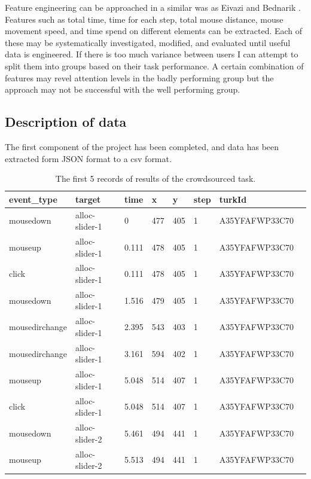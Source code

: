 \documentclass{article}
\begin{document}

Feature engineering can be approached in a similar was as Eivazi and Bednarik \cite{eivazi2011predicting}.
Features such as total time, time for each step, total mouse distance, mouse movement speed, and time spend on different elements can be extracted.
Each of these may be systematically investigated, modified, and evaluated until useful data is engineered.
If there is too much variance between users I can attempt to split them into groups based on their task performance.
A certain combination of features may revel attention levels in the badly performing group but the approach may not be successful with the well performing group. 


\subsection{Description of data}

The first component of the project has been completed, and data has been extracted form JSON format to a csv format.

\begin{table}[ht]
    \caption{\label{table:data} The first 5 records of results of the crowdsourced task.}

    \begin{tabular}{llllllll}
        \hline
        event\_type    & target         & time  & x   & y   & step & turkId         \\ \hline
        mousedown      & alloc-slider-1 & 0     & 477 & 405 & 1    & A35YFAFWP33C70 \\
        mouseup        & alloc-slider-1 & 0.111 & 478 & 405 & 1    & A35YFAFWP33C70 \\
        click          & alloc-slider-1 & 0.111 & 478 & 405 & 1    & A35YFAFWP33C70 \\
        mousedown      & alloc-slider-1 & 1.516 & 479 & 405 & 1    & A35YFAFWP33C70 \\
        mousedirchange & alloc-slider-1 & 2.395 & 543 & 403 & 1    & A35YFAFWP33C70 \\
        mousedirchange & alloc-slider-1 & 3.161 & 594 & 402 & 1    & A35YFAFWP33C70 \\
        mouseup        & alloc-slider-1 & 5.048 & 514 & 407 & 1    & A35YFAFWP33C70 \\
        click          & alloc-slider-1 & 5.048 & 514 & 407 & 1    & A35YFAFWP33C70 \\
        mousedown      & alloc-slider-2 & 5.461 & 494 & 441 & 1    & A35YFAFWP33C70 \\
        mouseup        & alloc-slider-2 & 5.513 & 494 & 441 & 1    & A35YFAFWP33C70 \\ \hline
    \end{tabular}
\end{table}
\end{document}
